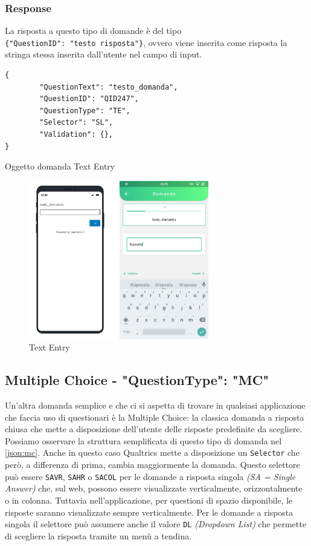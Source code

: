 \subsubsection{Response}
La risposta a questo tipo di domande è del tipo\\ \texttt{\{"QuestionID": "testo risposta"\}}, ovvero viene inserita come risposta la stringa stessa inserita dall'utente nel campo di input.

\newpage
\begin{json}
\begin{verbatim}
{
        "QuestionText": "testo_domanda",
        "QuestionID": "QID247",
        "QuestionType": "TE",
        "Selector": "SL",
        "Validation": {},
}
\end{verbatim}
\caption{Oggetto domanda Text Entry}
\label{json:text_entry}
\end{json}

\begin{figure}[h]
\centering
\includegraphics[width=0.7\textwidth]{img/text_entry_flutter}
\caption{Text Entry}
\label{fig:text_entry}
\end{figure}

\newpage
\subsection{Multiple Choice - "QuestionType": "MC"}
Un'altra domanda semplice e che ci si aspetta di trovare in qualsiasi applicazione che faccia uso di questionari è la Multiple Choice: la classica domanda a risposta chiusa che mette a disposizione dell'utente delle risposte predefinite da scegliere. Possiamo osservare la struttura semplificata di questo tipo di domanda nel \autoref{json:mc}. Anche in questo caso Qualtrics mette a disposizione un \texttt{Selector} che però, a differenza di prima, cambia maggiormente la domanda. Questo selettore può essere \texttt{SAVR}, \texttt{SAHR} o \texttt{SACOL} per le domande a risposta singola \textit{(SA = Single Answer)} che, sul web, possono essere visualizzate verticalmente, orizzontalmente o in colonna. Tuttavia nell'applicazione, per questioni di spazio disponibile, le risposte saranno visualizzate sempre verticalmente. Per le domande a risposta singola il selettore può assumere anche il valore \texttt{DL} \textit{(Dropdown List)} che permette di scegliere la risposta tramite un menù a tendina.

